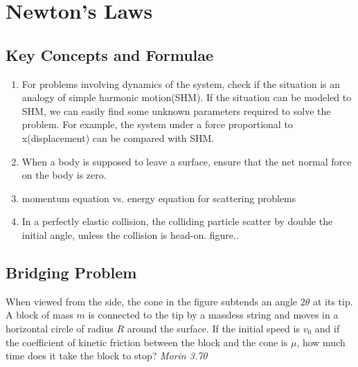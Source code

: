 \chapter{Newton's Laws}

\pagestyle{fancy}
\fancyhf{}
\fancyhead[OC]{\leftmark}
\fancyhead[EC]{\rightmark}
\cfoot{\thepage}

\section{Key Concepts and Formulae}


\begin{enumerate}
\item For problems involving dynamics of the system, check if the situation is an analogy of simple harmonic motion(SHM). If the situation can be modeled to SHM, we can easily find some unknown parameters required to solve the problem. For example, the system  under a force proportional to x(displacement) can be compared with SHM. 

\item When a body is supposed to leave a surface, ensure that the net normal force on the body is zero. 

\item momentum equation vs. energy equation for scattering problems

\item In a perfectly elastic collision, the colliding particle scatter by double the initial angle, unless the collision is head-on. figure..  

\end{enumerate}

\section{Bridging Problem}
When viewed from the side, the cone in the figure subtends an angle $2\theta$ at its tip. A block of mass $m$ is connected to the tip by a massless string and moves in a horizontal circle of radius $R$ around the surface. If the initial speed is $v_0$ and if the coefficient of kinetic friction between the block and the cone is $\mu$, how much time does it take the block to stop? \hfill \textsl{Morin 3.70}

\begin{figure}[hbt]
    \centering
    
\end{figure}

